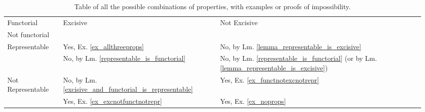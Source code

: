 \begin{table}[h]
    \begin{tabular}{l|ll}
        Functorial                         & \multirow{2}{*}{Excisive}       & \multirow{2}{*}{Not Excisive} \\ \cline{1-1}
        Not functorial                     &                                 &                               \\ \hline
        \multirow{2}{*}{Representable}     & \multicolumn{1}{l|}{Yes, Ex. \ref{ex_allthreeprops}} & No, by Lm. \ref{lemma_representable_is_excisive}                     \\
                                        & \multicolumn{1}{l|}{No, by Lm. \ref{representable_is_functorial}}   & No, by Lm. \ref{representable_is_functorial} (or by Lm. \ref{lemma_representable_is_excisive})            \\ \cline{2-3} 
        \multirow{2}{*}{Not Representable} & \multicolumn{1}{l|}{No, by Lm. \ref{excisive_and_functorial_is_representable}}   & Yes, Ex. \ref{ex_functnotexcnotrepr}                    \\
                                        & \multicolumn{1}{l|}{Yes, Ex. \ref{ex_excnotfunctnotrepr}} & Yes, Ex. \ref{ex_noprops}                   
    \end{tabular}
    \centering
    \label{table_twobytwobytwo}
    \caption{Table of all the possible combinations of properties, with examples or proofs of impossibility.}
\end{table}